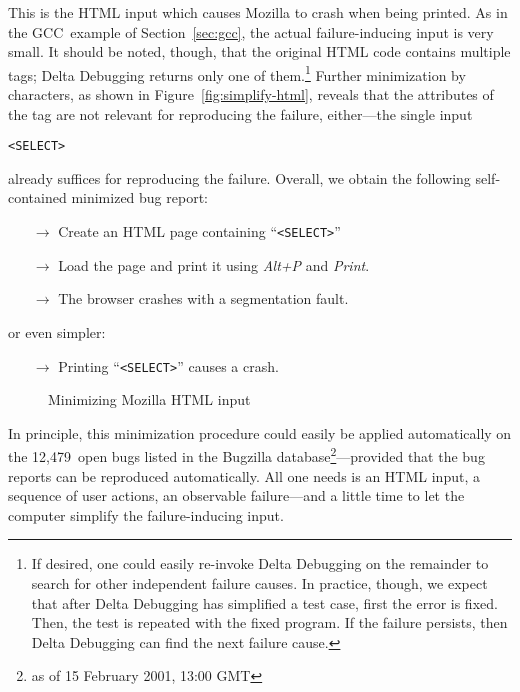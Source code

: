 \documentclass{acm_proc_article-sp}
\newcommand{\GCC}        {{\small GCC}\xspace}
\newcommand{\HTML}       {{\small HTML}\xspace}
\newcommand{\codeid}[1]{\text{\upshape\texttt{#1}}}
\def\<#1>{\codeid{#1}}
\theoremstyle{plain}
\let\oldfootnote=\footnote
\renewcommand{\footnote}[1]{\oldfootnote{\let\small=\scriptsize #1}}
\begin{document}
\noindent
This is the \HTML input which causes Mozilla to crash when being
printed.  As in the \GCC~example of Section~\ref{sec:gcc}, the actual
failure-inducing input is very small.  It should be noted, though,
that the original \HTML code contains multiple \<SELECT> tags; Delta
Debugging returns only one of them.\footnote{If desired, one could
  easily re-invoke Delta Debugging on the remainder to search for
  other independent failure causes.  In practice, though, we expect
  that after Delta Debugging has simplified a test case, first the
  error is fixed.  Then, the test is repeated with the fixed program.
  If the failure persists, then Delta Debugging can find the next
  failure cause.}
Further minimization by characters, as shown in
Figure~\ref{fig:simplify-html}, reveals that the attributes of the
\<SELECT> tag are not relevant for reproducing the failure,
either---the single input
\begin{alltt}
    <SELECT>
\end{alltt}
already suffices for reproducing the failure.  Overall, we obtain 
the following self-contained minimized bug report:
\begin{itemize}
\item[$\to$] Create an \HTML page containing ``\texttt{<SELECT>}''
\item[$\to$] Load the page and print it using \emph{Alt+P} and \emph{Print}.
\item[$\to$] The browser crashes with a segmentation fault.
\end{itemize}
or even simpler:
\begin{itemize}
\item[$\to$] Printing ``\texttt{<SELECT>}'' causes a crash.
\end{itemize}

\begin{figure}
\vspace{-1.1cm}
\vspace{-0.5cm}
\caption{Minimizing Mozilla \HTML input}
\label{fig:mozilla-html}
\vspace{-\baselineskip}
\end{figure}

\noindent
In principle, this minimization procedure could easily be applied
automatically on the 12,479~open bugs listed in the Bugzilla
database\footnote{as of 15 February 2001, 13:00 GMT}---provided that
the bug reports can be reproduced automatically.  All one needs is an
\HTML input, a sequence of user actions, an observable failure---and a
little time to let the computer simplify the failure-inducing input.
\end{document}
